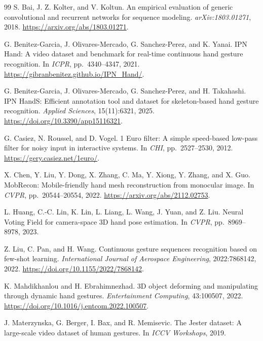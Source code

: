 \documentclass{article}
\begin{document}
\clearpage
\begin{thebibliography}{99}
\small
{}
S. Bai, J. Z. Kolter, and V. Koltun.
An empirical evaluation of generic convolutional and recurrent networks for sequence modeling.
\emph{arXiv:1803.01271}, 2018. \url{https://arxiv.org/abs/1803.01271}.

G. Benitez-Garcia, J. Olivares-Mercado, G. Sanchez-Perez, and K. Yanai.
IPN Hand: A video dataset and benchmark for real-time continuous hand gesture recognition.
In \emph{ICPR}, pp.\ 4340--4347, 2021.
\url{https://gibranbenitez.github.io/IPN_Hand/}.

G. Benitez-Garcia, J. Olivares-Mercado, G. Sanchez-Perez, and H. Takahashi.
IPN HandS: Efficient annotation tool and dataset for skeleton-based hand gesture recognition.
\emph{Applied Sciences}, 15(11):6321, 2025. \url{https://doi.org/10.3390/app15116321}.

G. Casiez, N. Roussel, and D. Vogel.
1 Euro filter: A simple speed-based low-pass filter for noisy input in interactive systems.
In \emph{CHI}, pp.\ 2527--2530, 2012. \url{https://gery.casiez.net/1euro/}.

X. Chen, Y. Liu, Y. Dong, X. Zhang, C. Ma, Y. Xiong, Y. Zhang, and X. Guo.
MobRecon: Mobile-friendly hand mesh reconstruction from monocular image.
In \emph{CVPR}, pp.\ 20544--20554, 2022. \url{https://arxiv.org/abs/2112.02753}.

L. Huang, C.-C. Lin, K. Lin, L. Liang, L. Wang, J. Yuan, and Z. Liu.
Neural Voting Field for camera-space 3D hand pose estimation.
In \emph{CVPR}, pp.\ 8969--8978, 2023.

Z. Liu, C. Pan, and H. Wang.
Continuous gesture sequences recognition based on few-shot learning.
\emph{International Journal of Aerospace Engineering}, 2022:7868142, 2022. \url{https://doi.org/10.1155/2022/7868142}.

K. Mahdikhanlou and H. Ebrahimnezhad.
3D object deforming and manipulating through dynamic hand gestures.
\emph{Entertainment Computing}, 43:100507, 2022. \url{https://doi.org/10.1016/j.entcom.2022.100507}.

J. Materzynska, G. Berger, I. Bax, and R. Memisevic.
The Jester dataset: A large-scale video dataset of human gestures.
In \emph{ICCV Workshops}, 2019.


\end{thebibliography}
\end{document}
